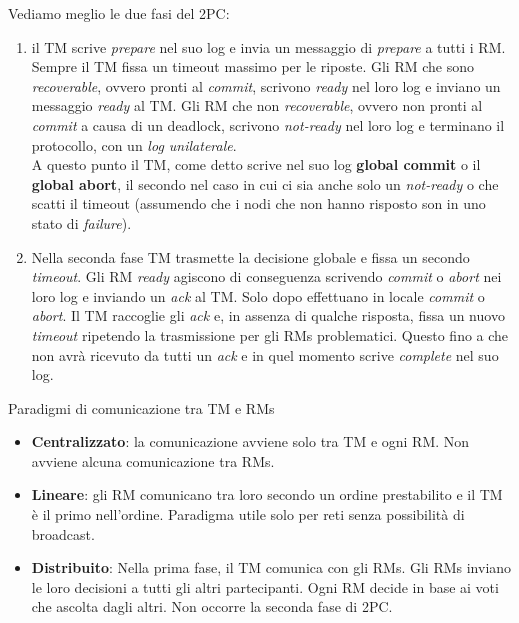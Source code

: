 Vediamo meglio le due fasi del 2PC:
\begin{enumerate} 
    \item il TM scrive \textit{prepare} nel suo log e invia un messaggio di \textit{prepare} a tutti i RM. Sempre il TM fissa un timeout massimo per le riposte. Gli RM che sono \textit{recoverable}, ovvero pronti al \textit{commit}, scrivono \textit{ready} nel loro log e inviano un messaggio \textit{ready} al TM. Gli RM che non \textit{recoverable}, ovvero non pronti al \textit{commit} a causa di un deadlock, scrivono \textit{not-ready} nel loro log e terminano il protocollo, con un \textit{log unilaterale}. \\
    A questo punto il TM, come detto scrive nel suo log \textbf{global commit} o il \textbf{global abort}, il secondo nel caso in cui ci sia anche solo un \textit{not-ready} o che scatti il timeout (assumendo che i nodi che non hanno risposto son in uno stato di \textit{failure}). 
    \item Nella seconda fase TM trasmette la decisione globale e fissa un secondo \textit{timeout}. Gli RM \textit{ready} agiscono di conseguenza scrivendo \textit{commit} o \textit{abort} nei loro log e inviando un \textit{ack} al TM. Solo dopo effettuano in locale \textit{commit} o \textit{abort}. Il TM raccoglie gli \textit{ack} e, in assenza di qualche risposta, fissa un nuovo \textit{timeout} ripetendo la trasmissione per gli RMs problematici. Questo fino a che non avrà ricevuto da tutti un \textit{ack} e in quel momento scrive \textit{complete} nel suo log.
\end{enumerate}

Paradigmi di comunicazione tra TM e RMs 
\begin{itemize}
    \item \textbf{Centralizzato}: la comunicazione avviene solo tra TM e ogni RM. Non avviene alcuna comunicazione tra RMs.
    \item \textbf{Lineare}: gli RM comunicano tra loro secondo un ordine prestabilito e il TM è il primo nell’ordine. Paradigma utile solo per reti senza possibilità di broadcast. 
    \item \textbf{Distribuito}: Nella prima fase, il TM comunica con gli RMs. Gli RMs inviano le loro decisioni a tutti gli altri partecipanti. Ogni RM decide in base ai voti che ascolta dagli altri. Non occorre la seconda fase di 2PC.

\end{itemize}


